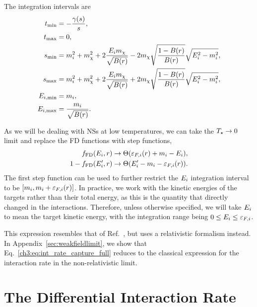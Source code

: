 The integration intervals are 
\begin{align}
    t_\mathrm{min} & = - \frac{\gamma(s)}{s},\\
    t_\mathrm{max} & = 0,\\
    s_\mathrm{min} & = m_i^2 + m_\chi^2 + 2 \frac{E_i m_\chi}{\sqrt{B(r)}} - 2m_\chi\sqrt{\frac{1 - B(r)}{B(r)}} \sqrt{E_i^2 - m_i^2}, \\
    s_\mathrm{max} & = m_i^2 + m_\chi^2 + 2 \frac{E_i m_\chi}{\sqrt{B(r)}} + 2m_\chi\sqrt{\frac{1 - B(r)}{B(r)}} \sqrt{E_i^2 - m_i^2}, \\
    E_{i,\mathrm{min}} & = m_i,\\
    E_{i,\mathrm{max}} & = \frac{m_i}{\sqrt{B(r)}}.
\end{align}

As we will be dealing with NSs at low temperatures, we can take the $T_\star\rightarrow 0$ limit and replace the FD functions with step functions, 
\begin{align}
    f_{\rm FD}(E_i, r) &\rightarrow \Theta(\varepsilon_{F,i}(r) +m_i - E_i),\\
    1 - f_{\rm FD}(E_i', r) & \rightarrow  \Theta(E_i'-m_i - \varepsilon_{F,i}(r) ).
\end{align}
The first step function can be used to further restrict the $E_i$ integration interval to be $[m_i, m_i + \varepsilon_{F,i}(r)]$. In practice, we work with the kinetic energies of the targets rather than their total energy, as this is the quantity that directly changed in the interactions. Therefore, unless otherwise specified, we will take $E_i$ to mean the target kinetic energy, with the integration range being $0\le E_i\le \varepsilon_{F,i}$.

This expression resembles that of Ref.~\cite{Garani:2018kkd_may_NewAnalysisNeutron}, but uses a relativistic formalism instead. In Appendix~\ref{sec:weakfieldlimit}, we show that Eq.~\ref{ch3:eq:int_rate_capture_full} reduces to the classical expression for the interaction rate in the non-relativistic limit. 


\section{The Differential Interaction Rate}
\label{ch3:sec:diff_int_rate}


